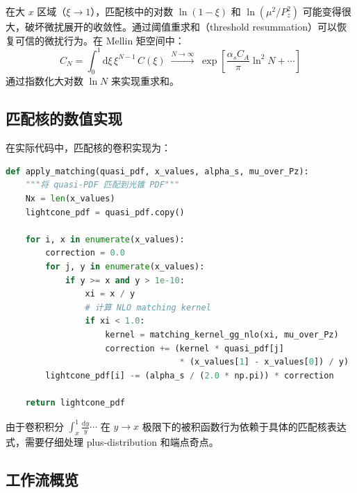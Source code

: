 \documentclass[11pt,a4paper]{ctexart}
\begin{document}
在大 $x$ 区域（$\xi \to 1$），匹配核中的对数 $\ln(1-\xi)$ 和 $\ln(\mu^2/P_z^2)$ 可能变得很大，破坏微扰展开的收敛性。通过阈值重求和（threshold resummation）可以恢复可信的微扰行为。在 Mellin 矩空间中：
\begin{equation}
C_N = \int_0^1 \mathrm{d}\xi \, \xi^{N-1} \, C(\xi) \;
\xrightarrow{N \to \infty} \;
\exp\!\left[ \frac{\alpha_s C_A}{\pi} \ln^2 N + \cdots \right]
\end{equation}
通过指数化大对数 $\ln N$ 来实现重求和。

\subsection{匹配核的数值实现}

在实际代码中，匹配核的卷积实现为：
\begin{lstlisting}[language=Python, caption=匹配核的数值实现]
def apply_matching(quasi_pdf, x_values, alpha_s, mu_over_Pz):
    """将 quasi-PDF 匹配到光锥 PDF"""
    Nx = len(x_values)
    lightcone_pdf = quasi_pdf.copy()

    for i, x in enumerate(x_values):
        correction = 0.0
        for j, y in enumerate(x_values):
            if y >= x and y > 1e-10:
                xi = x / y
                # 计算 NLO matching kernel
                if xi < 1.0:
                    kernel = matching_kernel_gg_nlo(xi, mu_over_Pz)
                    correction += (kernel * quasi_pdf[j]
                                   * (x_values[1] - x_values[0]) / y)
        lightcone_pdf[i] -= (alpha_s / (2.0 * np.pi)) * correction

    return lightcone_pdf
\end{lstlisting}

由于卷积积分 $\int_x^1 \frac{\mathrm{d}y}{y} \cdots$ 在 $y \to x$ 极限下的被积函数行为依赖于具体的匹配核表达式，需要仔细处理 plus-distribution 和端点奇点。

\subsection{工作流概览}
\end{document}
